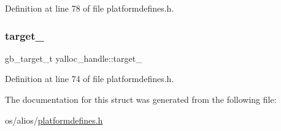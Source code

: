 Definition at line 78 of file platformdefines.\+h.

\mbox{\label{structyalloc__handle_a36250e79fcdc6f1e58020a9d2b891a48}} 
\subsubsection{\texorpdfstring{target\+\_\+}{target\_}}
{\footnotesize\ttfamily gb\+\_\+target\+\_\+t yalloc\+\_\+handle\+::target\+\_\+}



Definition at line 74 of file platformdefines.\+h.



The documentation for this struct was generated from the following file\+:\begin{DoxyCompactItemize}
\item 
os/alios/\mbox{\hyperlink{alios_2platformdefines_8h}{platformdefines.\+h}}\end{DoxyCompactItemize}
